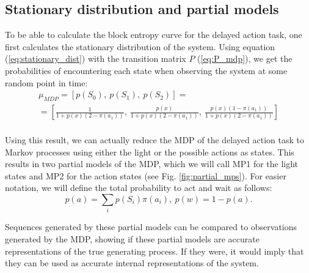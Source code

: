 \documentclass[12pt,a4paper]{article}
\begin{document}
\subsection{Stationary distribution and partial models} \label{ssec:res_stationary_dist}
To be able to calculate the block entropy curve for the delayed action task, one first calculates the stationary distribution of the system.
Using equation (\ref{eq:stationary_dist}) with the transition matrix $P$ (\ref{eq:P_mdp}), we get the probabilities of encountering each state when observing the system at some random point in time:
\begin{equation}
    \label{eq:result_stationary_dist_mdp}
    \begin{matrix}
        \mu_{MDP} = [p(S_0),\ p(S_1),\ p(S_2)] =       \\
        =[\frac{1}{1 + p(x)(2-\pi(a_1))},\
        \frac{p(x)}{1 + p(x)(2-\pi(a_1))},\
        \frac{p(x)(1-\pi(a_1))}{1 + p(x)(2-\pi(a_1))}] \\
    \end{matrix}
\end{equation}

Using this result, we can actually reduce the MDP of the delayed action task to Markov processes using either the light or the possible actions as states.
This results in two partial models of the MDP, which we will call MP1 for the light states and MP2 for the action states (see Fig. \ref{fig:partial_mps}).
For easier notation, we will define the total probability to act and wait as follows:
\begin{equation}
    \label{eq:result_prob_act_wait}
    p(a) = \sum_i p(S_i)\pi(a_i),\ p(w) = 1 - p(a).
\end{equation}

Sequences generated by these partial models can be compared to observations generated by the MDP, showing if these partial models are accurate representations of the true generating process.
If they were, it would imply that they can be used as accurate internal representations of the system.
\end{document}
